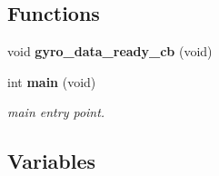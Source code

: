 \subsection*{Functions}
\begin{DoxyCompactItemize}
\item 
void \textbf{ gyro\+\_\+data\+\_\+ready\+\_\+cb} (void)
\item 
int \textbf{ main} (void)
\begin{DoxyCompactList}\small\item\em main entry point. \end{DoxyCompactList}\end{DoxyCompactItemize}
\subsection*{Variables}
